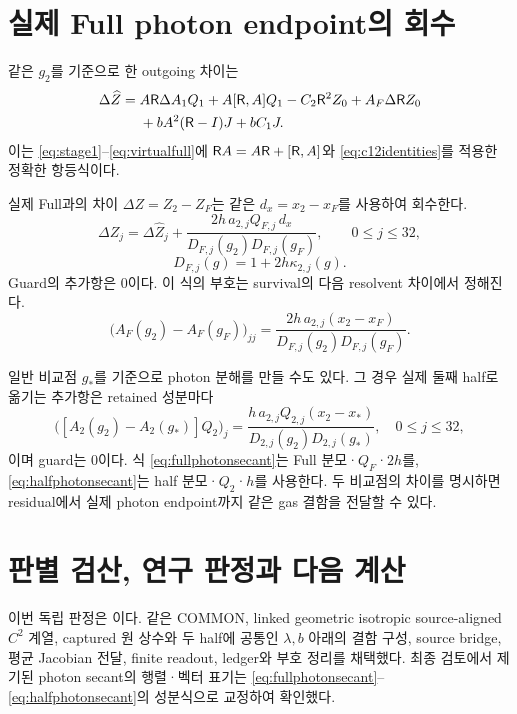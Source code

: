 \section{실제 Full photon endpoint의 회수}\label{sec:actual_photon}
같은 $g_2$를 기준으로 한 outgoing 차이는
\begin{equation}
\begin{aligned}
\Delta\widehat Z={}&A\mathsf R\Delta A_1Q_1+A[\mathsf R,A]Q_1-C_2\mathsf R^2Z_0
+A_F\Delta\mathsf R Z_0\\
&+bA^2(\mathsf R-I)J+bC_1J.
\end{aligned}
\label{eq:outgoing}
\end{equation}
이는 \eqref{eq:stage1}--\eqref{eq:virtualfull}에
$\mathsf R A=A\mathsf R+[\mathsf R,A]$와 \eqref{eq:c12identities}를 적용한 정확한 항등식이다.

실제 Full과의 차이 $\Delta Z=Z_2-Z_F$는 같은 $d_x=x_2-x_F$를 사용하여 회수한다.
\begin{equation}
\boxed{
\Delta Z_j=\Delta\widehat Z_j+
\frac{2h\,a_{2,j}Q_{F,j}\,d_x}
{D_{F,j}(g_2)D_{F,j}(g_F)},\qquad 0\le j\le32,
}
\label{eq:fullphotonsecant}
\end{equation}
\begin{equation}
D_{F,j}(g)=1+2h\kappa_{2,j}(g).
\end{equation}
Guard의 추가항은 0이다.
이 식의 부호는 survival의 다음 resolvent 차이에서 정해진다.
\[
\bigl(A_F(g_2)-A_F(g_F)\bigr)_{jj}
=\frac{2h\,a_{2,j}(x_2-x_F)}{D_{F,j}(g_2)D_{F,j}(g_F)}.
\]

일반 비교점 $g_*$를 기준으로 photon 분해를 만들 수도 있다.
그 경우 실제 둘째 half로 옮기는 추가항은 retained 성분마다
\begin{equation}
\bigl([A_2(g_2)-A_2(g_*)]Q_2\bigr)_j
=\frac{h\,a_{2,j}Q_{2,j}(x_2-x_*)}
{D_{2,j}(g_2)D_{2,j}(g_*)},\quad 0\le j\le32,
\label{eq:halfphotonsecant}
\end{equation}
이며 guard는 0이다.
식 \eqref{eq:fullphotonsecant}는 Full 분모·$Q_F$·$2h$를,
\eqref{eq:halfphotonsecant}는 half 분모·$Q_2$·$h$를 사용한다.
두 비교점의 차이를 명시하면 residual에서 실제 photon endpoint까지 같은 gas 결함을 전달할 수 있다.

\section{판별 검산, 연구 판정과 다음 계산}\label{sec:verification}


이번 독립 판정은 \textbf{\ReviewDecision}이다.
같은 COMMON, linked geometric isotropic source-aligned $C^2$ 계열,
captured 원 상수와 두 half에 공통인 $\lambda,b$ 아래의 결함 구성,
source bridge, 평균 Jacobian 전달, finite readout, ledger와 부호 정리를 채택했다.
최종 검토에서 제기된 photon secant의 행렬·벡터 표기는
\eqref{eq:fullphotonsecant}--\eqref{eq:halfphotonsecant}의 성분식으로 교정하여 확인했다.\cite{review}

